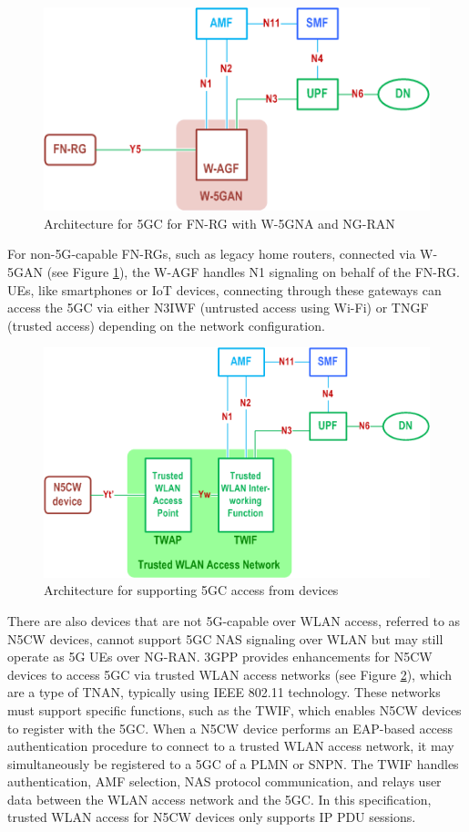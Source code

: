 \begin{figure}
    \centering
    \includegraphics[width=0.5\linewidth]{figs/Architecture for 5G Core Network for FN-RG with Wireline 5G Access network and NG RAN.png}
    \caption{Architecture for \acl{5GC} for \ac{FN-RG} with \ac{W-5GNA} and \ac{NG-RAN}}
    \label{fig:Architecture for 5G Core Network for FN-RG with Wireline 5G Access network and NG RAN}
\end{figure}

For non-\ac{5G}-capable \acp{FN-RG}, such as legacy home routers, connected via \ac{W-5GAN} (see Figure \ref{fig:Architecture for 5G Core Network for FN-RG with Wireline 5G Access network and NG RAN}), the \ac{W-AGF} handles N1 signaling on behalf of the \ac{FN-RG}. \acp{UE}, like smartphones or \ac{IoT} devices, connecting through these gateways can access the \ac{5GC} via either \ac{N3IWF} (untrusted access using Wi-Fi) or \ac{TNGF} (trusted access) depending on the network configuration.

\begin{figure}
    \centering
    \includegraphics[width=0.5\linewidth]{figs/Architecture for supporting 5GC access from N5CW devices.png}
    \caption{Architecture for supporting \ac{5GC} access from \ac{} devices}
    \label{fig:Architecture for supporting 5GC access from N5CW devices}
\end{figure}

There are also devices that are not \ac{5G}-capable over \ac{WLAN} access, referred to as \ac{N5CW} devices, cannot support \ac{5GC} \ac{NAS} signaling over \ac{WLAN} but may still operate as \ac{5G} \acp{UE} over \ac{NG-RAN}. \ac{3GPP} provides enhancements for N5CW devices to access \ac{5GC} via trusted \ac{WLAN} access networks (see Figure \ref{fig:Architecture for supporting 5GC access from N5CW devices}), which are a type of \ac{TNAN}, typically using IEEE 802.11 technology. These networks must support specific functions, such as the \ac{TWIF}, which enables \ac{N5CW} devices to register with the \ac{5GC}. When a \ac{N5CW} device performs an \ac{EAP}-based access authentication procedure to connect to a trusted \ac{WLAN} access network, it may simultaneously be registered to a \ac{5GC} of a \ac{PLMN} or \ac{SNPN}. The \ac{TWIF} handles authentication, \ac{AMF} selection, \ac{NAS} protocol communication, and relays user data between the \ac{WLAN} access network and the \ac{5GC}. In this specification, trusted \ac{WLAN} access for \ac{N5CW} devices only supports IP \ac{PDU} sessions.

